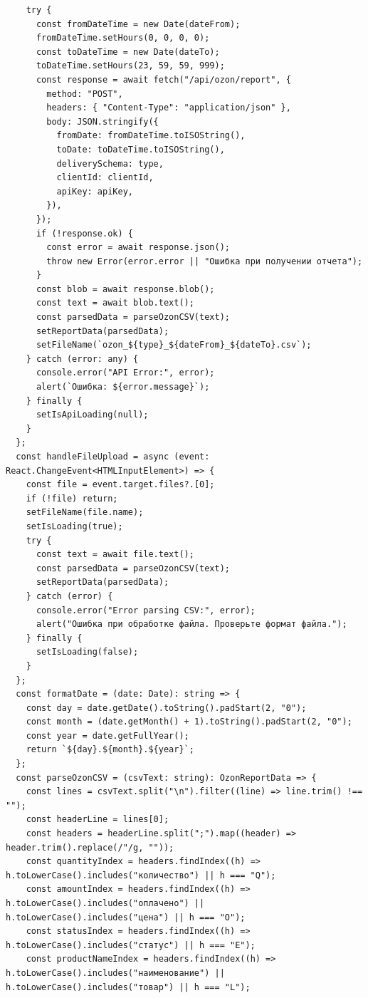\begin{code}
\begin{verbatim}
    try {
      const fromDateTime = new Date(dateFrom);
      fromDateTime.setHours(0, 0, 0, 0);
      const toDateTime = new Date(dateTo);
      toDateTime.setHours(23, 59, 59, 999);
      const response = await fetch("/api/ozon/report", {
        method: "POST",
        headers: { "Content-Type": "application/json" },
        body: JSON.stringify({
          fromDate: fromDateTime.toISOString(),
          toDate: toDateTime.toISOString(),
          deliverySchema: type,
          clientId: clientId,
          apiKey: apiKey,
        }),
      });
      if (!response.ok) {
        const error = await response.json();
        throw new Error(error.error || "Ошибка при получении отчета");
      }
      const blob = await response.blob();
      const text = await blob.text();
      const parsedData = parseOzonCSV(text);
      setReportData(parsedData);
      setFileName(`ozon_${type}_${dateFrom}_${dateTo}.csv`);
    } catch (error: any) {
      console.error("API Error:", error);
      alert(`Ошибка: ${error.message}`);
    } finally {
      setIsApiLoading(null);
    }
  };
  const handleFileUpload = async (event: React.ChangeEvent<HTMLInputElement>) => {
    const file = event.target.files?.[0];
    if (!file) return;
    setFileName(file.name);
    setIsLoading(true);
    try {
      const text = await file.text();
      const parsedData = parseOzonCSV(text);
      setReportData(parsedData);
    } catch (error) {
      console.error("Error parsing CSV:", error);
      alert("Ошибка при обработке файла. Проверьте формат файла.");
    } finally {
      setIsLoading(false);
    }
  };
  const formatDate = (date: Date): string => {
    const day = date.getDate().toString().padStart(2, "0");
    const month = (date.getMonth() + 1).toString().padStart(2, "0");
    const year = date.getFullYear();
    return `${day}.${month}.${year}`;
  };
  const parseOzonCSV = (csvText: string): OzonReportData => {
    const lines = csvText.split("\n").filter((line) => line.trim() !== "");
    const headerLine = lines[0];
    const headers = headerLine.split(";").map((header) => header.trim().replace(/"/g, ""));
    const quantityIndex = headers.findIndex((h) => h.toLowerCase().includes("количество") || h === "Q");
    const amountIndex = headers.findIndex((h) => h.toLowerCase().includes("оплачено") || h.toLowerCase().includes("цена") || h === "O");
    const statusIndex = headers.findIndex((h) => h.toLowerCase().includes("статус") || h === "E");
    const productNameIndex = headers.findIndex((h) => h.toLowerCase().includes("наименование") || h.toLowerCase().includes("товар") || h === "L");

\end{verbatim}
\end{code}
